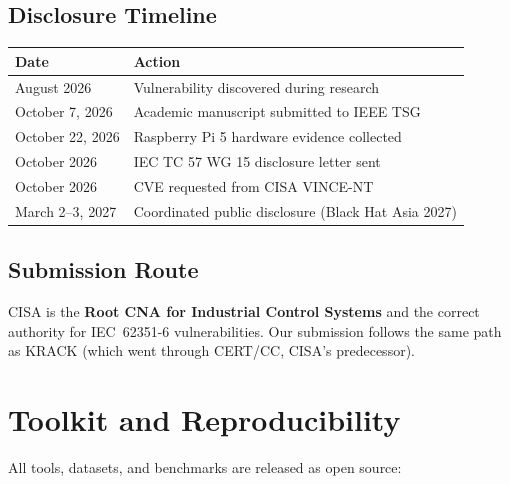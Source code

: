 \documentclass[11pt,a4paper]{article}
\begin{document}
\subsection{Disclosure Timeline}

\begin{table}[H]
\centering
\begin{tabular}{@{}ll@{}}
\toprule
\textbf{Date} & \textbf{Action} \\
\midrule
August 2026 & Vulnerability discovered during research \\
October 7, 2026 & Academic manuscript submitted to IEEE TSG \\
October 22, 2026 & Raspberry Pi 5 hardware evidence collected \\
October 2026 & IEC TC 57 WG 15 disclosure letter sent \\
October 2026 & CVE requested from CISA VINCE-NT \\
March 2--3, 2027 & Coordinated public disclosure (Black Hat Asia 2027) \\
\bottomrule
\end{tabular}
\end{table}

\subsection{Submission Route}

CISA is the \textbf{Root CNA for Industrial Control Systems} and the correct authority for IEC~62351-6 vulnerabilities. Our submission follows the same path as KRACK (which went through CERT/CC, CISA's predecessor).

\section{Toolkit and Reproducibility}

All tools, datasets, and benchmarks are released as open source:
\end{document}

